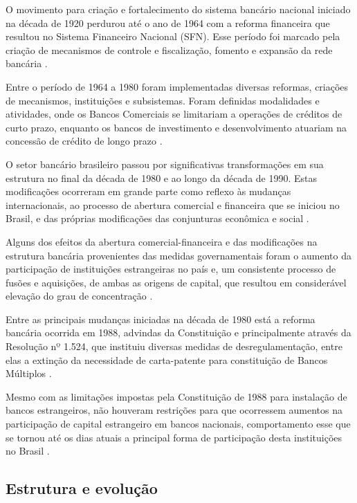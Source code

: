 \documentclass[
  12pt,
  12pt,
  openright,
  oneside,
  a4paper,
  chapter=TITLE,
  section=TITLE,
  subsection=TITLE,
  subsubsection=TITLE,
  english,
  portugues,
  sumario=tradicional]{abntex2}
\begin{document}
O movimento para criação e fortalecimento do sistema bancário nacional iniciado na década de 1920 perdurou até o ano de 1964 com a reforma financeira que resultou no Sistema Financeiro Nacional (SFN). Esse período foi marcado pela criação de mecanismos de controle e fiscalização, fomento e expansão da rede bancária \cite{camargo:2009, guimaraes:2011}.

Entre o período de 1964 a 1980 foram implementadas diversas reformas, criações de mecanismos, instituições e subsistemas. Foram definidas modalidades e atividades, onde os Bancos Comerciais se limitariam a operações de créditos de curto prazo, enquanto os bancos de investimento e desenvolvimento atuariam na concessão de crédito de longo prazo \cite{camargo:2009}.

O setor bancário brasileiro passou por significativas transformações em sua estrutura no final da década de 1980 e ao longo da década de 1990. Estas modificações ocorreram em grande parte como reflexo às mudanças internacionais, ao processo de abertura comercial e financeira que se iniciou no Brasil, e das próprias modificações das conjunturas econômica e social \cite{camargo:2009}.

Alguns dos efeitos da abertura comercial-financeira e das modificações na estrutura bancária provenientes das medidas governamentais foram o aumento da participação de instituições estrangeiras no país e, um consistente processo de fusões e aquisições, de ambas as origens de capital, que resultou em considerável elevação do grau de concentração \cite{camargo:2009}.

Entre as principais mudanças iniciadas na década de 1980 está a reforma bancária ocorrida em 1988, advindas da Constituição e principalmente através da Resolução nº 1.524, que instituiu diversas medidas de desregulamentação, entre elas a extinção da necessidade de carta-patente para constituição de Bancos Múltiplos \cite{Res:1524:1988}.

Mesmo com as limitações impostas pela Constituição de 1988 \cite{constituicao:1988} para instalação de bancos estrangeiros, não houveram restrições para que ocorressem aumentos na participação de capital estrangeiro em bancos nacionais, comportamento esse que se tornou até os dias atuais a principal forma de participação desta instituições no Brasil \cite{camargo:2009}.

\subsection{Estrutura e evolução}
\end{document}
